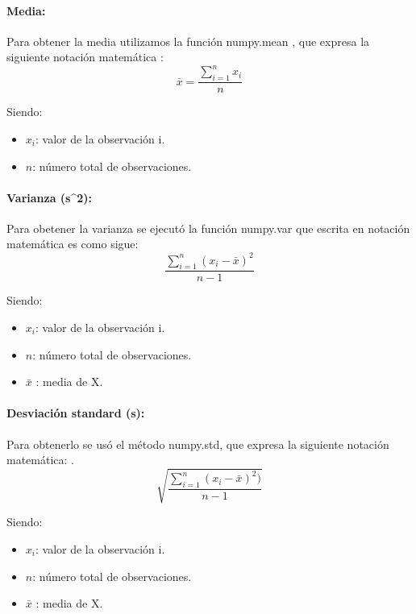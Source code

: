 \documentclass{article}
\begin{document}
\paragraph {Media:}Para obtener la media utilizamos la función numpy.mean , que expresa la siguiente notación matemática :  \begin{equation}\bar{x}=\frac{\sum_{i=1}^{n} x_i}{n} \end{equation}

Siendo:\begin{itemize}
\item $x_{i}$: valor de la observación i.

\item $n$: número total de observaciones.
\end{itemize}

\paragraph {Varianza (s^{2}):}Para obetener la varianza se ejecutó la función numpy.var que escrita en notación matemática es como sigue: \begin{equation} \frac{\sum_{i=1}^{n}(x_i - \bar{x})^{2}}{n - 1}  \end{equation}

Siendo:\begin{itemize}
\item $x_{i}$: valor de la observación i.

\item $n$: número total de observaciones.

\item $\bar{x}$ : media de X.
\end{itemize}
\paragraph {Desviación standard (s):}Para obtenerlo se usó el método numpy.std, que expresa la siguiente notación matemática:
.
\begin{equation} \sqrt{\frac{\sum_{i=1}^{n}(x_i - \bar{x})^{2})}{n - 1}} \end{equation}

Siendo:\begin{itemize}

\item $x_{i}$: valor de la observación i.

\item $n$: número total de observaciones.

\item $\bar{x}$ : media de X.
\end{itemize}
\end{document}
